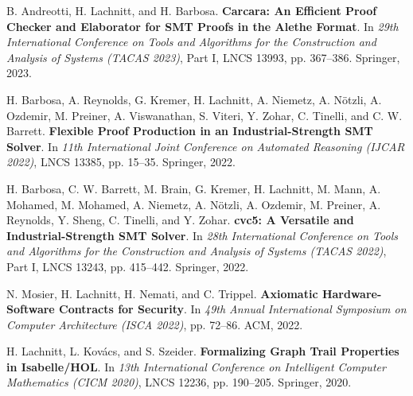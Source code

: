 \documentclass[a4paper,11pt]{article}
\newcommand{\cvsubsection}[1]{\vspace{1mm}{\underline{\textit{\textbf{#1}}}}\par\vspace{-3.5mm}}
\begin{document}
{\begin{enumerate}[leftmargin=*, labelsep=0.5em, align=left, widest={[12]}, itemindent=0em, label={[\arabic*]}, series=pubs]
\item\label{pub:carcara} B. Andreotti, H. Lachnitt, and H. Barbosa. \textbf{Carcara: An Efficient Proof Checker and Elaborator for SMT Proofs in the Alethe Format}. In \textit{29th International Conference on Tools and Algorithms for the Construction and Analysis of Systems (TACAS 2023)}, Part I, LNCS 13993, pp. 367--386. Springer, 2023.

\item\label{pub:ijcar22} H. Barbosa, A. Reynolds, G. Kremer, H. Lachnitt, A. Niemetz, A. Nötzli, A. Ozdemir, M. Preiner, A. Viswanathan, S. Viteri, Y. Zohar, C. Tinelli, and C. W. Barrett. \textbf{Flexible Proof Production in an Industrial-Strength SMT Solver}. In \textit{11th International Joint Conference on Automated Reasoning (IJCAR 2022)}, LNCS 13385, pp. 15--35. Springer, 2022.

\item\label{pub:cvc5} H. Barbosa, C. W. Barrett, M. Brain, G. Kremer, H. Lachnitt, M. Mann, A. Mohamed, M. Mohamed, A. Niemetz, A. Nötzli, A. Ozdemir, M. Preiner, A. Reynolds, Y. Sheng, C. Tinelli, and Y. Zohar. \textbf{cvc5: A Versatile and Industrial-Strength SMT Solver}. In \textit{28th International Conference on Tools and Algorithms for the Construction and Analysis of Systems (TACAS 2022)}, Part I, LNCS 13243, pp. 415--442. Springer, 2022.

\item\label{pub:isca22} N. Mosier, H. Lachnitt, H. Nemati, and C. Trippel. \textbf{Axiomatic Hardware-Software Contracts for Security}. In \textit{49th Annual International Symposium on Computer Architecture (ISCA 2022)}, pp. 72--86. ACM, 2022.

\item\label{pub:cicm20} H. Lachnitt, L. Kovács, and S. Szeider. \textbf{Formalizing Graph Trail Properties in Isabelle/HOL}. In \textit{13th International Conference on Intelligent Computer Mathematics (CICM 2020)}, LNCS 12236, pp. 190--205. Springer, 2020.
\end{enumerate}
}

\cvsubsection{Journal Papers}
\end{document}
